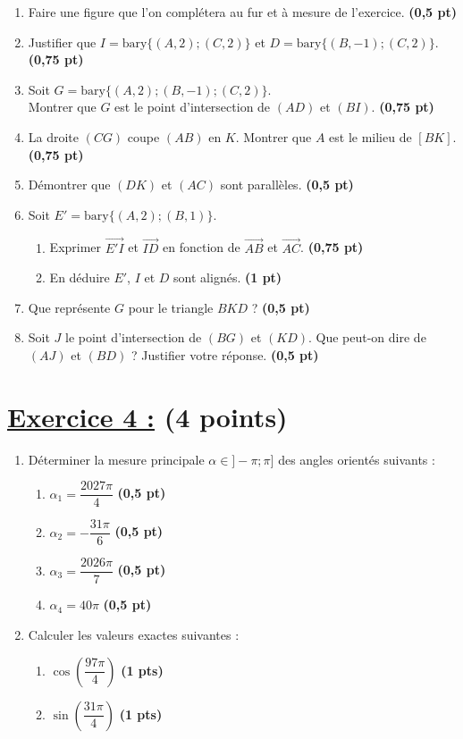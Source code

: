 \documentclass[12pt,a4paper]{article}
\begin{document}
\begin{enumerate}
    \item Faire une figure que l'on complétera au fur et à mesure de l'exercice. \textbf{(0,5 pt)}
    \item Justifier que $I = \text{bary}\{(A, 2); (C, 2)\}$ et $D = \text{bary}\{(B, -1); (C, 2)\}$. \textbf{(0,75 pt)}
    \item Soit $G = \text{bary}\{(A, 2); (B, -1); (C, 2)\}$.\\ Montrer que $G$ est le point d'intersection de $(AD)$ et $(BI)$. \textbf{(0,75 pt)}
    \item La droite $(CG)$ coupe $(AB)$ en $K$. Montrer que $A$ est le milieu de $[BK]$. \textbf{(0,75 pt)}
    \item Démontrer que $(DK)$ et $(AC)$ sont parallèles. \textbf{(0,5 pt)}
    \item Soit $E' = \text{bary}\{(A, 2); (B, 1)\}$.
    \begin{enumerate}
        \item Exprimer $\overrightarrow{E'I}$ et $\overrightarrow{ID}$ en fonction de $\overrightarrow{AB}$ et $\overrightarrow{AC}$. \textbf{(0,75 pt)}
        \item En déduire $E'$, $I$ et $D$ sont alignés. \textbf{(1 pt)}
    \end{enumerate}
    \item Que représente $G$ pour le triangle $BKD$ ? \textbf{(0,5 pt)}
    \item Soit $J$ le point d'intersection de $(BG)$ et $(KD)$. Que peut-on dire de $(AJ)$ et $(BD)$ ? Justifier votre réponse. \textbf{(0,5 pt)}
\end{enumerate}
\section*{\underline{Exercice 4 :} (4 points) }

\begin{enumerate}
\item Déterminer la mesure principale $\alpha \in ]-\pi ; \pi]$ des angles orientés suivants :

\begin{enumerate}
    \item $\alpha_1 = \dfrac{2027\pi}{4}$ \hfill \textbf{(0,5 pt)}
    \item $\alpha_2 = -\dfrac{31\pi}{6}$ \hfill \textbf{(0,5 pt)}
    \item $\alpha_3 = \dfrac{2026\pi}{7}$ \hfill \textbf{(0,5 pt)}
    \item $\alpha_4 = 40\pi$ \hfill \textbf{(0,5 pt)}
\end{enumerate}

\item Calculer les valeurs exactes suivantes : 
\begin{enumerate}
\item $\cos \left( \dfrac{97\pi}{4} \right)$ \hfill \textbf{(1 pts)}
\item $\sin \left( \dfrac{31\pi}{4} \right)$ \hfill \textbf{(1 pts)}
\end{enumerate}
\end{enumerate}
\end{document}
